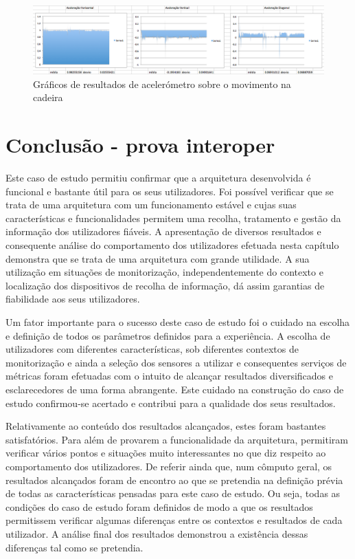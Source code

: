  \begin{figure}[htb]
   \centering
   \includegraphics[scale=0.3]{Images/aceleracao.png}
   \caption{Gráficos de resultados de acelerómetro sobre o movimento na cadeira}
\end{figure}



\section{Conclusão - prova interoper}

Este caso de estudo permitiu confirmar que a arquitetura desenvolvida é funcional e bastante útil para os seus utilizadores. Foi possível verificar que se trata de uma arquitetura com um funcionamento estável e cujas suas características e funcionalidades permitem uma recolha, tratamento e gestão da informação dos utilizadores fiáveis. A apresentação de diversos resultados e consequente análise do comportamento dos utilizadores efetuada nesta capítulo demonstra que se trata de uma arquitetura com grande utilidade. A sua utilização em situações de monitorização, independentemente do contexto e localização dos dispositivos de recolha de informação, dá assim garantias de fiabilidade aos seus utilizadores.

Um fator importante para o sucesso deste caso de estudo foi o cuidado na escolha e definição de todos os parâmetros definidos para a experiência. A escolha de utilizadores com diferentes características, sob diferentes contextos de monitorização e ainda a seleção dos sensores a utilizar e consequentes serviços de métricas foram efetuadas com o intuito de alcançar resultados diversificados e esclarecedores de uma forma abrangente. Este cuidado na construção do caso de estudo confirmou-se acertado e contribui para a qualidade dos seus resultados.

Relativamente ao conteúdo dos resultados alcançados, estes foram bastantes satisfatórios. Para além de provarem a funcionalidade da arquitetura, permitiram verificar vários pontos e situações muito interessantes no que diz respeito ao comportamento dos utilizadores. De referir ainda que, num cômputo geral, os resultados alcançados foram de encontro ao que se pretendia na definição prévia de todas as características pensadas para este caso de estudo. Ou seja, todas as condições do caso de estudo foram definidos de modo a que os resultados permitissem verificar algumas diferenças entre os contextos e resultados de cada utilizador. A análise final dos resultados demonstrou a existência dessas diferenças tal como se pretendia.


